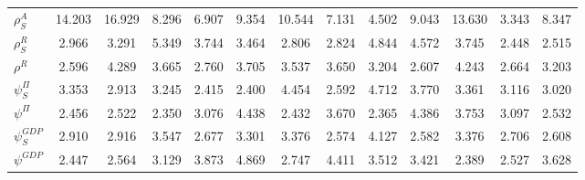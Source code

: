 \begin{center}
\begin{longtable}{lcccccccccccc}
$ {\rho^{A}_{S}}     $	 & 	      14.203	 & 	      16.929	 & 	       8.296	 & 	       6.907	 & 	       9.354	 & 	      10.544	 & 	       7.131	 & 	       4.502	 & 	       9.043	 & 	      13.630	 & 	       3.343	 & 	       8.347 \\ 
$ {\rho^{R}_{S}}     $	 & 	       2.966	 & 	       3.291	 & 	       5.349	 & 	       3.744	 & 	       3.464	 & 	       2.806	 & 	       2.824	 & 	       4.844	 & 	       4.572	 & 	       3.745	 & 	       2.448	 & 	       2.515 \\ 
$ {\rho^{R}}         $	 & 	       2.596	 & 	       4.289	 & 	       3.665	 & 	       2.760	 & 	       3.705	 & 	       3.537	 & 	       3.650	 & 	       3.204	 & 	       2.607	 & 	       4.243	 & 	       2.664	 & 	       3.203 \\ 
$ {\psi^{\Pi}_{S}}   $	 & 	       3.353	 & 	       2.913	 & 	       3.245	 & 	       2.415	 & 	       2.400	 & 	       4.454	 & 	       2.592	 & 	       4.712	 & 	       3.770	 & 	       3.361	 & 	       3.116	 & 	       3.020 \\ 
$ {\psi^{\Pi}}       $	 & 	       2.456	 & 	       2.522	 & 	       2.350	 & 	       3.076	 & 	       4.438	 & 	       2.432	 & 	       3.670	 & 	       2.365	 & 	       4.386	 & 	       3.753	 & 	       3.097	 & 	       2.532 \\ 
$ {\psi^{GDP}_{S}}   $	 & 	       2.910	 & 	       2.916	 & 	       3.547	 & 	       2.677	 & 	       3.301	 & 	       3.376	 & 	       2.574	 & 	       4.127	 & 	       2.582	 & 	       3.376	 & 	       2.706	 & 	       2.608 \\ 
$ {\psi^{GDP}}       $	 & 	       2.447	 & 	       2.564	 & 	       3.129	 & 	       3.873	 & 	       4.869	 & 	       2.747	 & 	       4.411	 & 	       3.512	 & 	       3.421	 & 	       2.389	 & 	       2.527	 & 	       3.628 \\ 
\end{longtable}
 \end{center}
